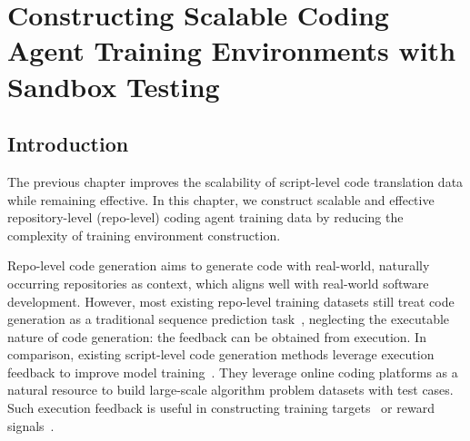 





























\chapter{Constructing Scalable Coding Agent Training Environments with Sandbox Testing}
\label{chap:repost}

\section{Introduction}
The previous chapter improves the scalability of script-level code translation data while remaining effective.
In this chapter, we construct scalable and effective repository-level (repo-level) coding agent training data by reducing the complexity of training environment construction.

Repo-level code generation aims to generate code with real-world, naturally occurring repositories as context, which aligns well with real-world software development.
However, most existing repo-level training datasets still treat code generation as a traditional sequence prediction task~\cite{codesearchnet,swebench}, neglecting the executable nature of code generation: the feedback can be obtained from execution.
In comparison, existing script-level code generation methods leverage execution feedback to improve model training~\cite{NEXT,plum,RLTF}.
They leverage online coding platforms as a natural resource to build large-scale algorithm problem datasets with test cases.
Such execution feedback is useful in constructing training targets~\citep{NEXT,plum} or reward signals~\citep{RLTF,exp_refine}.


